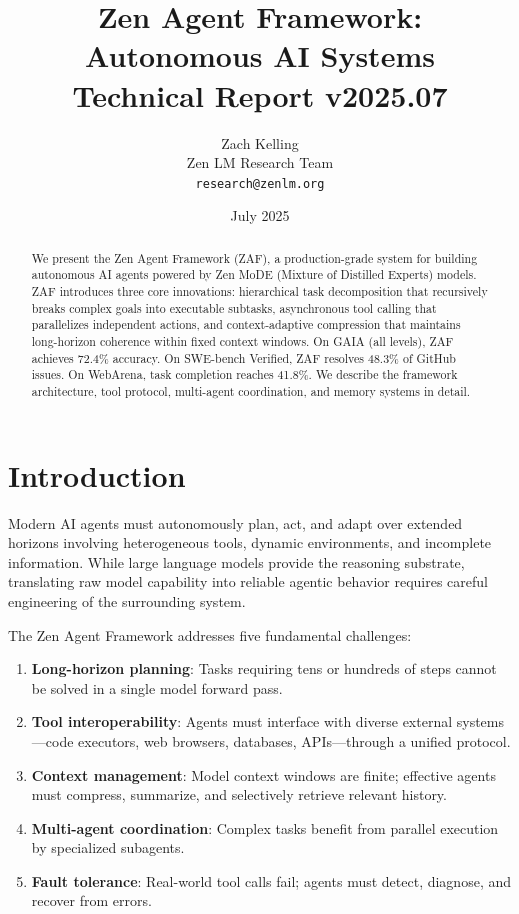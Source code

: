 \documentclass[11pt,a4paper]{article}
\title{\textbf{Zen Agent Framework: Autonomous AI Systems}\\
\large Technical Report v2025.07}
\author{Zach Kelling \\ Zen LM Research Team\\
\texttt{research@zenlm.org}}
\date{July 2025}
\begin{document}
\maketitle

\begin{abstract}
We present the Zen Agent Framework (ZAF), a production-grade system for building autonomous AI agents powered by Zen MoDE (Mixture of Distilled Experts) models. ZAF introduces three core innovations: hierarchical task decomposition that recursively breaks complex goals into executable subtasks, asynchronous tool calling that parallelizes independent actions, and context-adaptive compression that maintains long-horizon coherence within fixed context windows. On GAIA (all levels), ZAF achieves 72.4\% accuracy. On SWE-bench Verified, ZAF resolves 48.3\% of GitHub issues. On WebArena, task completion reaches 41.8\%. We describe the framework architecture, tool protocol, multi-agent coordination, and memory systems in detail.
\end{abstract}

\section{Introduction}

Modern AI agents must autonomously plan, act, and adapt over extended horizons involving heterogeneous tools, dynamic environments, and incomplete information. While large language models provide the reasoning substrate, translating raw model capability into reliable agentic behavior requires careful engineering of the surrounding system.

The Zen Agent Framework addresses five fundamental challenges:

\begin{enumerate}
  \item \textbf{Long-horizon planning}: Tasks requiring tens or hundreds of steps cannot be solved in a single model forward pass.
  \item \textbf{Tool interoperability}: Agents must interface with diverse external systems—code executors, web browsers, databases, APIs—through a unified protocol.
  \item \textbf{Context management}: Model context windows are finite; effective agents must compress, summarize, and selectively retrieve relevant history.
  \item \textbf{Multi-agent coordination}: Complex tasks benefit from parallel execution by specialized subagents.
  \item \textbf{Fault tolerance}: Real-world tool calls fail; agents must detect, diagnose, and recover from errors.
\end{enumerate}
\end{document}
